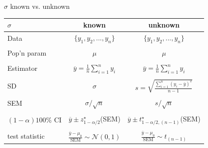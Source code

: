 \documentclass{beamer}\usepackage[]{graphicx}\usepackage[]{color}
\begin{document}
\begin{frame}{$\sigma$ known vs. unknown}
\begin{center}
	\begin{tabular}{|l|c|c|} \hline
		$\sigma$& known & unknown \\ \hline Data & $\{y_1,y_2,...,y_n\}$ &
		$\{y_1,y_2,...,y_n\}$\\
		& & \\
		Pop'n param & $\mu$ & $\mu$\\
		& & \\
		Estimator & $\overline{y} = \frac{1}{n}\sum_{i=1}^n y_i$ & $\overline{y} = \frac{1}{n}\sum_{i=1}^n y_i$ \\
		& & \\
		SD & $\sigma$ & $s = \sqrt{\frac{\sum_{i=1}^n(y_i-\overline{y})^2}{n-1}}$ \\
		& & \\
		SEM & $\sigma/\sqrt{n}$ & $s / \sqrt{n}$ \\
		& & \\
		$(1-\alpha)100$\% CI & $\overline{y} \pm z^\star_{1-\alpha/2}$(SEM) & $\overline{y} \pm t^\star_{1-\alpha/2, (n-1)}$(SEM) \\
		& & \\
		test statistic & $\frac{\overline{y}-\mu_0}{\textrm{SEM}}\sim \mathcal{N}(0,1)$ &
		$\frac{\overline{y}-\mu_0}{\textrm{SEM}}\sim t_{(n-1)}$ \\
		\hline
	\end{tabular}
\end{center}
\end{frame}
\end{document}
